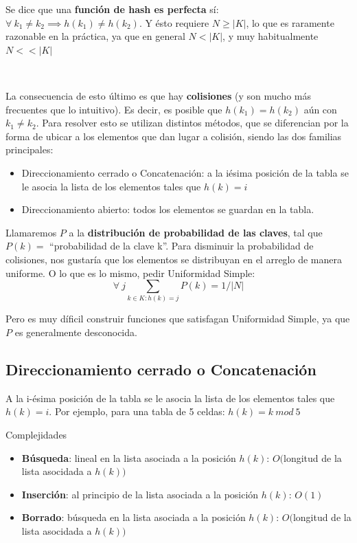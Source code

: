 Se dice que una \textbf{funci\'on de hash es perfecta} s\'i: $\forall\ k_1 \neq k_2 \implies h(k_1) \neq h(k_2)$. Y \'esto requiere $N \geq |K|$, lo que es raramente razonable en la pr\'actica, ya que en general $N < |K|$, y muy habitualmente $N < < |K|$

~

La consecuencia de esto \'ultimo es que hay \textbf{colisiones} (y son mucho m\'as frecuentes que lo intuitivo). Es decir, es posible que $h(k_1) = h(k_2)$ a\'un con $k_1 \neq k_2 $. Para resolver esto se utilizan distintos m\'etodos, que se diferencian por la forma de ubicar a los elementos que dan lugar a colisi\'on, siendo las dos familias principales:
\begin{itemize}
 \item Direccionamiento cerrado o Concatenaci\'on: a la i\-\'esima posici\'on de la tabla se le asocia la lista de los elementos tales que $h(k)=i$
 \item Direccionamiento abierto: todos los elementos se guardan en la tabla.
\end{itemize}

Llamaremos $P$ a la \textbf{distribuci\'on de probabilidad de las claves}, tal que $P(k) = $ ``probabilidad de la clave k''. Para disminuir la probabilidad de colisiones, nos gustar\'ia que los elementos se distribuyan en el arreglo de manera uniforme. O lo que es lo mismo, pedir Uniformidad Simple:
$$\forall\ j \sum_{k \in K : h(k) = j}P(k) = 1 / |N|$$

Pero es muy d\'ificil construir funciones que satisfagan Uniformidad Simple, ya que $P$ es generalmente desconocida.

\subsection{Direccionamiento cerrado o Concatenaci\'on}
A la i-\'esima posici\'on de la tabla se le asocia la lista de los elementos tales que $h(k)=i$. Por ejemplo, para una tabla de 5 celdas: $h(k) = k\ mod\ 5$

Complejidades
\begin{itemize}
 \item \textbf{B\'usqueda}: lineal en la lista asociada a la posici\'on $h(k)$: $O($longitud de la lista asocidada a $h(k))$
 \item \textbf{Inserci\'on}: al principio de la lista asociada a la posici\'on $h(k)$: $O(1)$
 \item \textbf{Borrado}: b\'usqueda en la lista asociada a la posici\'on $h(k)$: $O($longitud de la lista asocidada a $h(k))$
\end{itemize}

